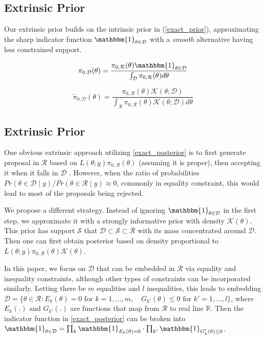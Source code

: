 \documentclass[10pt]{article}
\newcommand{\mc}[1]{\mathcal{#1}}
\DeclareMathOperator{\1}{\mathbbm{1}}
\begin{document}
\subsection{Extrinsic Prior}
Our extrinsic prior builds on the intrinsic prior in (\ref{exact_prior}), approximating the sharp indicator function
$\mathbbm{1}_{\theta\in \mc D}$ with a {\em smooth} alternative having less constrained support.


$$\pi_{0,\mc D}(\theta) = \frac{ \pi_{0,\mc R}(\theta) \mathbbm{1}_{\theta\in \mc D} }{ \int_{\mc D} \pi_{0,\mc R}(\theta)d\theta }$$

$$\tilde{\pi}_{0,\mc D}(\theta) = \frac{ \pi_{0,\mc R}(\theta) \mathcal{K}( \theta; \mc D) }{ \int_{\mc R} \pi_{0,\mc R}(\theta) \mathcal{K}(\theta; \mc D)d\theta }
$$


\subsection{Extrinsic Prior}

One obvious extrinsic approach utilizing \eqref{exact_posterior} is to first generate proposal in $\mc R$ based on $L(\theta;y)\pi_{0,\mc R}(\theta)$ (assuming it is proper), then accepting it when it falls in $\mc D$ \citep{gelfand1992bayesian}. However, when the ratio of probabilities $Pr(\theta\in \mc D \mid y) / Pr(\theta\in \mc R \mid y) \approx 0$, commonly in equality constraint, this would lead to most of the proposals being rejected.

We propose a different strategy. Instead of ignoring $\mathbbm{1}_{\theta\in \mc D} $ in the first step, we approximate it with a strongly informative prior with density $\mc K(\theta)$. This prior has support $\mc S$ that $\mc D\subset\mc S\subset\mc R$ with its mass concentrated around $\mc D$. Then one can first obtain posterior based on density proportional to $L(\theta;y)\pi_{0,\mc R}(\theta)\mc K(\theta)$.

In this paper, we focus on $\mc D$ that can be embedded in $\mc R$ via equality and inequality constraints, although other types of constraints can be incorporated similarly. Letting there be $m$ equalities and $l$ inequalities, this leads to embedding $\mc D = \{ \theta \in \mc R: E_k(\theta)=0 \text{ for } k=1,\ldots,m, \quad G_{k'}(\theta)\le 0  \text{ for } k'=1,\ldots,l \}$, where $E_k(.)$ and $G_{k'}(.)$ are functions that map from $\mc R$ to real line $\mathbb R$. Then the indicator function in \eqref{exact_posterior} can be broken into $\mathbbm{1}_{\theta\in \mc D} = \prod_k \mathbbm{1}_{E_k(\theta)=0} \cdot \prod_{k'}\mathbbm{1}_{G_k'(\theta)\le 0}$.
\end{document}
